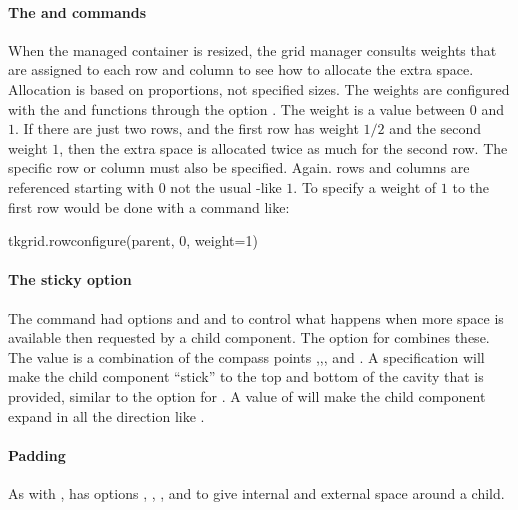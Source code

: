 \paragraph{The  and  commands}
When the managed container is resized, the grid manager consults
weights that are assigned to each row and column to see how to
allocate the extra space. Allocation is based on proportions, not
specified sizes. The weights are configured with the
 and 
functions through the option .
The weight is a value between $0$ and $1$. If there are just two rows, and
the first row has weight $1/2$ and the second weight $1$, then the extra
space is allocated twice as much for the second row. The specific row
or column must also be specified. Again. rows and columns are referenced
starting with $0$ not the usual \R-like $1$. To specify a weight of $1$
to the first row would be done with a command like:

%
\begin{Schunk}
\begin{Sinput}
 tkgrid.rowconfigure(parent, 0, weight=1)
\end{Sinput}
\end{Schunk}
%
\paragraph{The sticky option}
The  command had options  and
 and  to control what happens when more space
is available then requested by a child component. The
 option for  combines
these. The value is a combination of the compass points
,,, and . A specification
 will make the child component ``stick'' to the top and
bottom of the cavity that is provided, similar to the 
option for . A value of  will make the
child component expand in all the direction like .

\paragraph{Padding}
As with ,  has options
, , ,
and  to give internal and external space around a
child.

